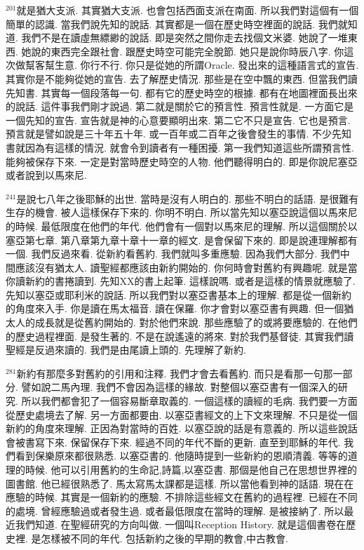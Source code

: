 \documentclass{book}
\begin{document}
$^{201}$就是猶大支派.
其實猶大支派.
也會包括西面支派在南面.
所以我們對這個有一個簡單的認識.
當我們說先知的說話.
其實都是一個在歷史時空裡面的說話.
我們就知道.
我們不是在讀虛無縹緲的說話.
即是突然之間你走去找個文米婆.
她說了一堆東西.
她說的東西完全跟社會.
跟歷史時空可能完全脫節.
她只是說你時辰八字.
你這次做幫客幫生意.
你行不行.
你只是從她的所謂Oracle.
發出來的這種語言式的宣告.
其實你是不能夠從她的宣告.
去了解歷史情況.
那些是在空中飄的東西.
但當我們讀先知書.
其實每一個段落每一句.
都有它的歷史時空的根據.
都有在地圖裡面長出來的說話.
這件事我們剛才說過.
第二就是關於它的預言性.
預言性就是.
一方面它是一個先知的宣告.
宣告就是神的心意要顯明出來.
第二它不只是宣告.
它也是預言.
預言就是譬如說是三十年五十年.
或一百年或二百年之後會發生的事情.
不少先知書就因為有這樣的情況.
就會令到讀者有一種困擾.
第一我們知道這些所謂預言性.
能夠被保存下來.
一定是對當時歷史時空的人物.
他們聽得明白的.
即是你說尼塞亞或者說到以馬來尼.

$^{241}$是說七八年之後耶穌的出世.
當時是沒有人明白的.
那些不明白的話語.
是很難有生存的機會.
被人這樣保存下來的.
你明不明白.
所以當先知以塞亞說這個以馬來尼的時候.
最低限度在他們的年代.
他們會有一個對以馬來尼的理解.
所以這個關於以塞亞第七章.
第八章第九章十章十一章的經文.
是會保留下來的.
即是說連理解都有一個.
我們反過來看.
從新約看舊約.
我們就叫多重應驗.
因為我們大部分.
我們中間應該沒有猶太人.
讀聖經都應該由新約開始的.
你何時會對舊約有興趣呢.
就是當你讀新約的書捲讀到.
先知XX的書上起筆.
這樣說嗎.
或者是這樣的情景就應驗了.
先知以塞亞或耶利米的說話.
所以我們對以塞亞書基本上的理解.
都是從一個新約的角度來入手.
你是讀在馬太福音.
讀在保羅.
你才會對以塞亞書有興趣.
但一個猶太人的成長就是從舊約開始的.
對於他們來說.
那些應驗了的或將要應驗的.
在他們的歷史過程裡面.
是發生著的.
不是在說遙遠的將來.
對於我們基督徒.
其實我們讀聖經是反過來讀的.
我們是由尾讀上頭的.
先理解了新約.

$^{281}$新約有那麼多對舊約的引用和注釋.
我們才會去看舊約.
而只是看那一句那一部分.
譬如說二馬內理.
我們不會因為這樣的緣故.
對整個以塞亞書有一個深入的研究.
所以我們都會犯了一個容易斷章取義的.
一個這樣的讀經的毛病.
我們要一方面從歷史處境去了解.
另一方面都要由.
以塞亞書經文的上下文來理解.
不只是從一個新約的角度來理解.
正因為對當時的百姓.
以塞亞說的話是有意義的.
所以這些說話會被書寫下來.
保留保存下來.
經過不同的年代不斷的更新.
直至到耶穌的年代.
我們看到保樂原來都很熟悉.
以塞亞書的.
他隨時提到一些新約的恩順清義.
等等的道理的時候.
他可以引用舊約的生命記,詩篇,以塞亞書.
那個是他自己在思想世界裡的圖書館.
他已經很熟悉了.
馬太寫馬太課都是這樣.
所以當他看到神的話語.
現在在應驗的時候.
其實是一個新約的應驗.
不排除這些經文在舊約的過程裡.
已經在不同的處境.
曾經應驗過或者發生過.
或者最低限度在當時的理解.
是被接納了.
所以最近我們知道.
在聖經研究的方向叫做.
一個叫Reception History.
就是這個書卷在歷史裡.
是怎樣被不同的年代.
包括新約之後的早期的教會,中古教會.
\end{document}
